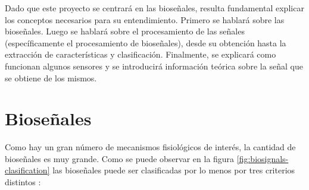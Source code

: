Dado que este proyecto se centrará en las bioseñales, resulta fundamental explicar los conceptos necesarios para su entendimiento. Primero se hablará sobre las bioseñales. Luego se hablará sobre el procesamiento de las señales (específicamente el procesamiento de bioseñales), desde su obtención hasta la extracción de características y clasificación. Finalmente, se explicará como funcionan algunos sensores y se introducirá información teórica sobre la señal que se obtiene de los mismos.

\section{Bioseñales}\label{sec:biosignals}

Como hay un gran número de mecanismos fisiológicos de interés, la cantidad de bioseñales es muy grande. Como se puede observar en la figura \ref{fig:biosignals-clasification} las bioseñales puede ser clasificadas por lo menos por tres criterios distintos \cite{biosignal-book-2}: 


